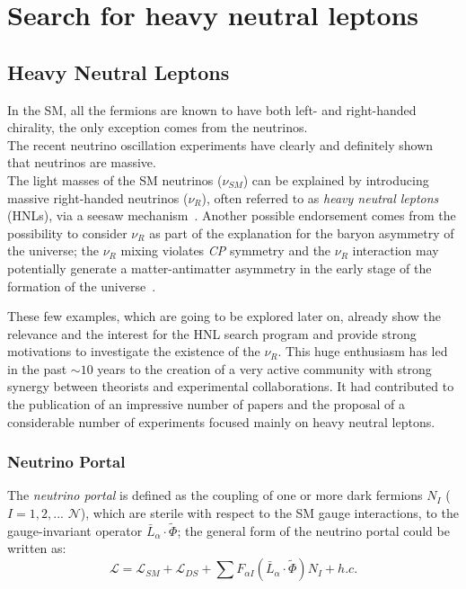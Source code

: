 
\part {Search for heavy neutral leptons}


\chapter{Heavy Neutral Leptons} 
\label{Chapter3} 


In the SM, all the fermions are known to have both left- and right-handed chirality, the only exception comes from the neutrinos.\\
The recent neutrino oscillation experiments have clearly and
definitely shown that neutrinos are massive.\\
The light masses of the SM neutrinos ($\nu_{SM}$) can be explained by introducing massive right-handed neutrinos ($\nu_{R}$), often referred to as \emph{heavy neutral leptons} (HNLs), via a seesaw mechanism~\cite{MINKOWSKI1977421,gellmann2013complex,PhysRevLett.44.912,PhysRevD.22.2227}.
Another possible endorsement comes from the possibility to consider
$\nu_{R}$ as part of the explanation for the baryon asymmetry of the
universe; the $\nu_{R}$ mixing violates \emph{CP} symmetry and the $\nu_{R}$ interaction may potentially generate a matter-antimatter asymmetry in the early stage of the formation of the universe~\cite{Canetti_2012,KUZMIN198536}.

These few examples, which are going to be explored later on, already
show the relevance and the interest for the HNL search program and
provide strong motivations to investigate the existence of the
$\nu_{R}$. This huge enthusiasm has led in the past $\sim10$ years to
the creation of a very active community with strong synergy between
theorists and experimental collaborations. It had contributed to the publication of an impressive number of papers and the proposal of a considerable number of experiments focused mainly on heavy neutral leptons. 

\section{Neutrino Portal} \label{sec:neutrinoPortal}
The \emph{neutrino portal} is defined as the coupling of one or more dark fermions $N_{I}$  ($I = 1,2,...$ $\mathcal{N}$), which are sterile with respect to the SM gauge interactions, to the gauge-invariant operator $\bar{L}_{\alpha}  \cdot \widetilde \Phi$; the general form of the neutrino portal could be written as: 
\begin{equation}
\label{eq:neutrinoportal}
\mathcal{L} = \mathcal{L}_{SM} + \mathcal{L}_{DS} + \sum F_{\alpha I} (\bar{L}_{\alpha}  \cdot \widetilde \Phi)N_{I} + h.c.
\end{equation}

